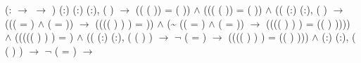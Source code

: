\documentclass[12pt]{report}
\begin{document}
\begin{coqdoccode}
\coqdocindent{1.00em}
\coqdockw{\ensuremath{\forall}} (: \ensuremath{\rightarrow}  \ensuremath{\rightarrow} ) (:) (:) (:), (   ) \ensuremath{\rightarrow}\coqdoceol
\coqdocindent{1.00em}
(( (    )) = ( )) \ensuremath{\land}\coqdoceol
\coqdocindent{1.00em}
((( (    )) = ( )) \ensuremath{\land}\coqdoceol
\coqdocindent{1.50em}
((\coqdockw{\ensuremath{\forall}} (:) (:), (   ) \ensuremath{\rightarrow}\coqdoceol
\coqdocindent{2.50em}
((( = ) \ensuremath{\land} ( = )) \ensuremath{\rightarrow} ((((    ) ) ) = )) \ensuremath{\land}\coqdoceol
\coqdocindent{2.50em}
(\~{} (( = ) \ensuremath{\land} ( = )) \ensuremath{\rightarrow} ((((    ) ) ) = (( ) )))) \ensuremath{\land}\coqdoceol
\coqdocindent{2.00em}
(((((    ) ) ) = ) \ensuremath{\land}\coqdoceol
\coqdocindent{2.50em}
((\coqdockw{\ensuremath{\forall}} (:) (:), ( (    )  ) \ensuremath{\rightarrow} \ensuremath{\lnot} ( = ) \ensuremath{\rightarrow}\coqdoceol
\coqdocindent{3.50em}
((((    ) ) ) = (( ) ))) \ensuremath{\land}\coqdoceol
\coqdocindent{3.00em}
\coqdockw{\ensuremath{\forall}} (:) (:), ( (    )  ) \ensuremath{\rightarrow} \ensuremath{\lnot} ( = ) \ensuremath{\rightarrow}\coqdoceol

\end{coqdoccode}
\end{document}
